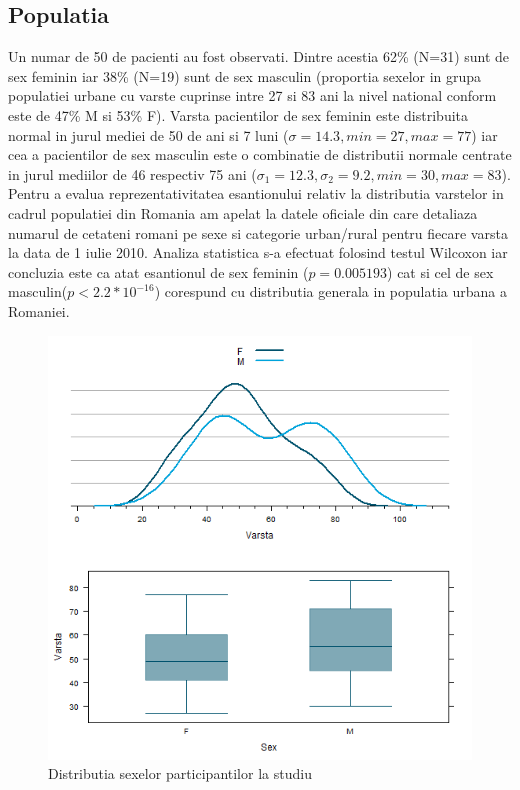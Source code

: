 \documentclass[11pt,draft]{article}
\begin{document}
    \subsection{Populatia}
    Un numar de 50 de pacienti au fost observati. Dintre acestia 62\% (N=31) sunt de sex feminin iar 38\% (N=19) sunt de sex masculin (proportia sexelor in grupa populatiei urbane cu varste cuprinse intre 27 si 83 ani la nivel national conform \citep{insee2011} este de 47\% M si 53\% F).
    Varsta pacientilor de sex feminin este distribuita normal in jurul mediei de 50 de ani si 7 luni ($\sigma=14.3,min=27,max=77$) iar cea a pacientilor de sex masculin este o combinatie de distributii normale centrate in jurul mediilor de 46 respectiv 75 ani ($\sigma_{1}=12.3 , \sigma_{2}=9.2,min=30,max=83$).
    Pentru a evalua reprezentativitatea esantionului relativ la distributia varstelor in cadrul populatiei din Romania am apelat la datele oficiale din \citep{insee2011} care detaliaza numarul de cetateni romani pe sexe si categorie urban/rural pentru fiecare varsta la data de 1 iulie 2010. Analiza statistica s-a efectuat folosind testul Wilcoxon iar concluzia este ca atat esantionul de sex feminin ($p=0.005193$) cat si cel de sex masculin($p<2.2*10^{-16}$) corespund cu distributia generala in populatia urbana a Romaniei.
    \begin{figure}[H]
	\centering
	\includegraphics[width=0.8\linewidth]{incoVarstaSex}
	\caption{Distributia sexelor participantilor la studiu}
	\label{fig:Distributia sexelor participantilor la studiu}
    \end{figure}
\end{document}
